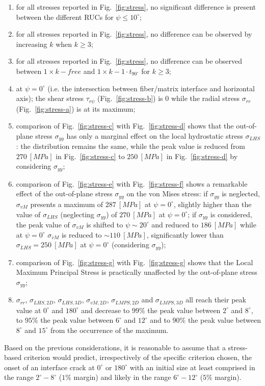 \documentclass[12pt,a4paper]{article}
\begin{document}
\begin{enumerate}
\itemsep-0.5pt
\item for all stresses reported in Fig.~\ref{fig:stress}, no significant difference is present between the different RUCs for $\psi\leq10^{\circ}$;
\item for all stresses reported in Fig.~\ref{fig:stress}, no difference can be observed by increasing $k$ when $k\geq3$;
\item for all stresses reported in Fig.~\ref{fig:stress}, no difference can be observed between $1\times  k-free$ and $1\times  k-1\cdot t_{90^{\circ}}$ for $k\geq3$;
\item at $\psi=0^{\circ}$ (i.e. the intersection between fiber/matrix interface and horizontal axis); the shear stress $\tau_{r\psi}$ (Fig.~\ref{fig:stress-b}) is $0$ while the radial stress $\sigma_{rr}$ (Fig.~\ref{fig:stress-a}) is at its maximum;
\item comparison of Fig.~\ref{fig:stress-c} with Fig.~\ref{fig:stress-d} shows that the out-of-plane stress $\sigma_{yy}$ has only a marginal effect on the local hydrostatic stress $\sigma_{LHS}$: the distribution remains the same, while the peak value is reduced from $270\ \left[MPa\right]$ in Fig.~\ref{fig:stress-c} to $250\ \left[MPa\right]$ in Fig.~\ref{fig:stress-d} by considering $\sigma_{yy}$;
\item comparison of Fig.~\ref{fig:stress-e} with Fig.~\ref{fig:stress-f} shows a remarkable effect of the out-of-plane stress $\sigma_{yy}$ on the von Mises stress: if $\sigma_{yy}$ is neglected, $\sigma_{vM}$ presents a maximum of $287\ \left[MPa\right]$ at $\psi=0^{\circ}$, slightly higher than the value of $\sigma_{LHS}$ (neglecting $\sigma_{yy}$) of $270\ \left[MPa\right]$ at $\psi=0^{\circ}$; if $\sigma_{yy}$ is considered, the peak value of $\sigma_{vM}$ is shifted to $\psi\sim20^{\circ}$ and reduced to $186\ \left[MPa\right]$ while at $\psi=0^{\circ}$ $\sigma_{vM}$ is reduced to $\sim110\ \left[MPa\right]$, significantly lower than $\sigma_{LHS}=250\ \left[MPa\right]$ at $\psi=0^{\circ}$ (considering $\sigma_{yy}$);
\item comparison of Fig.~\ref{fig:stress-g} with Fig.~\ref{fig:stress-g} shows that the Local Maximum Principal Stress is practically unaffected by the out-of-plane stress $\sigma_{yy}$;
\item $\sigma_{rr}$, $\sigma_{LHS,2D}$, $\sigma_{LHS,3D}$, $\sigma_{vM,2D}$, $\sigma_{LMPS,2D}$ and $\sigma_{LMPS,3D}$ all reach their peak value at $0^{\circ}$ and $180^{\circ}$ and decrease to $99\%$ the peak value between $2^{\circ}$ and $8^{\circ}$, to $95\%$ the peak value between $6^{\circ}$ and $12^{\circ}$ and to $90\%$ the peak value between $8^{\circ}$ and $15^{\circ}$ from the occurrence of the maximum.
\end{enumerate}
\vspace{-5pt}
Based on the previous considerations, it is reasonable to assume that a stress-based criterion would predict, irrespectively of the specific criterion chosen, the onset of an interface crack at $0^{\circ}$ or $180^{\circ}$ with an initial size at least comprised in the range $2^{\circ}-8^{\circ}$ ($1\%$ margin) and likely in the range $6^{\circ}-12^{\circ}$ ($5\%$ margin).
\end{document}
